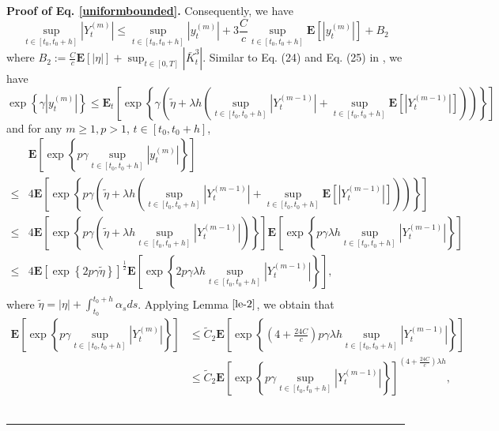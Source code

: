 \documentclass[10pt]{article}%
\numberwithin{equation}{section}
\newenvironment{proof}[1][Proof]{\noindent \textbf{#1.} }{\  \rule{0.5em}{0.5em}}
\begin{document}
\begin{proof}[Proof of Eq. \eqref{uniformbounded}]
Consequently, we have
\begin{equation}\label{supY}
    \sup_{t\in[t_0, t_0+h]}|Y^{(m)}_t|\leq\sup_{t\in[t_0, t_0+h]}|y^{(m)}_t|+3\frac{C}{c}\sup_{t\in[t_0, t_0+h]}\mathbf{E}[|y^{(m)}_t|]+B_2
\end{equation}
where $B_2:=\frac{C}{c}\mathbf{E}\left[\left|\eta\right|\right]+\sup_{t\in[0, T]}\left|\bar{K}^3_t\right|$. Similar to Eq. (24) and Eq. (25) in \cite{HMW},  we have 
$$\exp\left\{\gamma|y_{t}^{(m)}|\right\}\leq \mathbf{E}_{t}\left[\exp\left\{\gamma\left(\widetilde{\eta}+\lambda h\left(\sup_{t\in[t_0, t_0+h]}\left|Y^{(m-1)}_t\right|+\sup_{t\in[t_0, t_0+h]}\mathbf{E}\left[\left|Y^{(m-1)}_t\right|\right]\right)\right)\right\}\right]$$
and for any $m\geq 1, p > 1$, $t\in[t_0,t_0+h]$,
\begin{equation}\label{yineq}
\begin{split}
&\mathbf{E}\left[\exp\left\{p\gamma\sup_{t\in[t_0,t_0+h]}|y_{t}^{(m)}|\right\}\right]\\
\leq& 4\mathbf{E}\left[\exp\left\{p\gamma\left(\widetilde{\eta} +\lambda h\left(\sup_{t\in[t_0, t_0+h]}\left|Y^{(m-1)}_t\right|+\sup_{t\in[t_0, t_0+h]}\mathbf{E}\left[\left|Y^{(m-1)}_t\right|\right]\right)\right)\right\}\right] \\   
\leq& 4\mathbf{E}\left[\exp\left\{p\gamma\left(\widetilde{\eta}+\lambda h\sup_{t\in[t_0, t_0+h]}\left|Y^{(m-1)}_t\right|\right)\right\}\right]\mathbf{E}\left[\exp\left\{p\gamma\lambda h\sup_{t\in[t_0,t_0+h]}\left|Y^{(m-1)}_t\right|\right\}\right]\\
\leq& 4\mathbf{E}\left[\exp\left\{2p\gamma\widetilde{\eta}\right\}\right]^{\frac{1}{2}}\mathbf{E}\left[\exp\left\{2p \gamma \lambda h \sup_{t\in[t_0,t_0+h]}\left|Y^{(m-1)}_t\right|\right\}\right],\\
\end{split}  
\end{equation}
where $\widetilde{\eta}=|\eta |+\int_{t_0}^{t_0+h} \alpha_s ds $. Applying Lemma $\ref{le-2}$,  we obtain that
$$
\begin{aligned}
	 \mathbf{E}\left[\exp \left\{p \gamma \sup _{t\in[t_0,t_0+h]}\left|Y_t^{(m)}\right|\right\}\right] &\leq \widetilde{C}_2 \mathbf{E}\left[\exp \left\{\left(4+\frac{24C}{c}\right) p \gamma \lambda h \sup _{t\in[t_0,t_0+h]}\left|Y_t^{(m-1)}\right|\right\}\right] \\
 &\leq \widetilde{C}_2 \mathbf{E}\left[\exp \left\{ p \gamma  \sup _{t\in[t_0,t_0+h]}\left|Y_t^{(m-1)}\right|\right\}\right]^{\left(4+\frac{24C}{c}\right)\lambda h},
\end{aligned}
$$
\end{proof}
\end{document}
